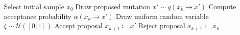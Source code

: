 \documentclass[oneside, a4paper]{article}
\newcommand\br[1]{\left(#1\right)}
\begin{document}
\begin{algorithm}[H]
  \caption{Metropolis-Hastings Algorithm}
  \label{alg:metropolis}
  \begin{algorithmic}[1]
    \State Select initial sample $x_0$
      \State Draw proposed mutation $x' \sim q(x_k \to x')$ 
      \State Compute acceptance probability $\alpha\br{x_k\to x'}$ 
      \State Draw uniform random variable $\xi \sim \mathcal{U}\br{[0;1]}$
      \If{$\alpha\br{x_k\to x'} \geq \xi$}
        \State Accept proposal $x_{k+1} \coloneq x'$
      \Else 
        \State Reject proposal $x_{k+1} \coloneq x_k$ 
      \EndIf
    \EndFor
  \end{algorithmic}
\end{algorithm}
\end{document}
